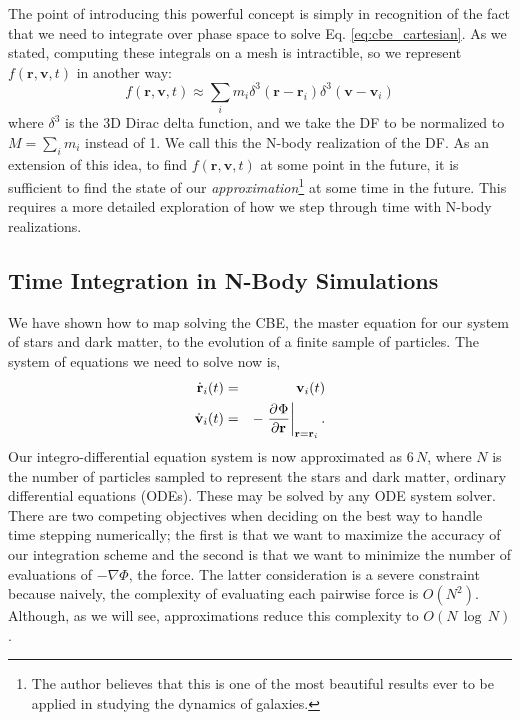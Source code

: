 The point of introducing this powerful concept is simply in recognition of the fact that we need to integrate over phase space to solve Eq. \eqref{eq:cbe_cartesian}. As we stated, computing these integrals on a mesh is intractible, so we represent $f(\textbf{r},\textbf{v},t)$ in another way:
\begin{equation}
f(\textbf{r},\textbf{v},t) \approx \sum_i m_i \delta^3(\textbf{r} - \textbf{r}_i) \delta^3(\textbf{v} - \textbf{v}_i)
\end{equation}
where $\delta^3$ is the 3D Dirac delta function, and we take the DF to be normalized to $M = \sum_i m_i$ instead of 1. We call this the N-body realization of the DF. As an extension of this idea, to find $f(\textbf{r},\textbf{v},t)$ at some point in the future, it is sufficient to find the state of our \textit{approximation}\footnote{The author believes that this is one of the most beautiful results ever to be applied in studying the dynamics of galaxies.} at some time in the future. This requires a more detailed exploration of how we step through time with N-body realizations.

\subsection{Time Integration in N-Body Simulations}

We have shown how to map solving the CBE, the master equation for our system of stars and dark matter, to the evolution of a finite sample of particles. The system of equations we need to solve now is,
\begin{eqnarray}
\dot{\textbf{r}}_i(t) &=& \textbf{v}_i(t)\\
\dot{\textbf{v}}_i(t) &=& -\left.\frac{\partial^{} {\Phi}}{\partial {\textbf{r}}^{}}\right\vert_{\textbf{r} = \textbf{r}_i}.
\end{eqnarray}
Our integro-differential equation system is now approximated as $6\,N$, where $N$ is the number of particles sampled to represent the stars and dark matter, ordinary differential equations (ODEs). These may be solved by any ODE system solver. There are two competing objectives when deciding on the best way to handle time stepping numerically; the first is that we want to maximize the accuracy of our integration scheme and the second is that we want to minimize the number of evaluations of $-\nabla \Phi$, the force. The latter consideration is a severe constraint because naively, the complexity of evaluating each pairwise force is $O(N^2)$.  Although, as we will see, approximations reduce this complexity to $O(N\,\log \, N)$. 

